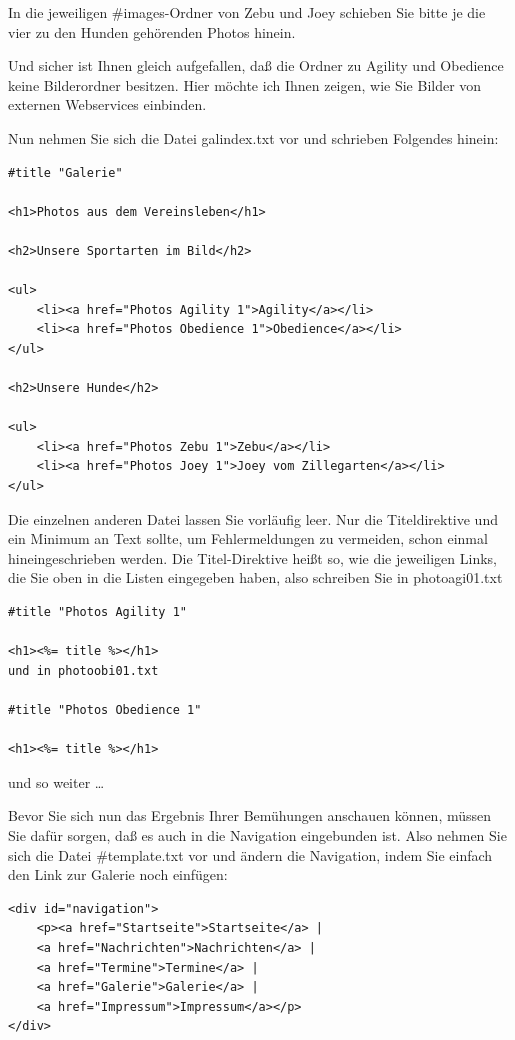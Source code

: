 \documentclass[11pt]{report}
\begin{document}
In die jeweiligen \#images-Ordner von Zebu und Joey schieben Sie bitte
je die vier zu den Hunden gehörenden Photos hinein.


Und sicher ist Ihnen gleich aufgefallen, daß die Ordner zu Agility und
Obedience keine Bilderordner besitzen. Hier möchte ich Ihnen zeigen,
wie Sie Bilder von externen Webservices einbinden.


Nun nehmen Sie sich die Datei galindex.txt vor und schrieben Folgendes
hinein:


\begin{verbatim}
#title "Galerie"

<h1>Photos aus dem Vereinsleben</h1>

<h2>Unsere Sportarten im Bild</h2>

<ul>
    <li><a href="Photos Agility 1">Agility</a></li>
    <li><a href="Photos Obedience 1">Obedience</a></li>
</ul>

<h2>Unsere Hunde</h2>

<ul>
    <li><a href="Photos Zebu 1">Zebu</a></li>
    <li><a href="Photos Joey 1">Joey vom Zillegarten</a></li>
</ul>
\end{verbatim}

Die einzelnen anderen Datei lassen Sie vorläufig leer. Nur die
Titeldirektive und ein Minimum an Text sollte, um Fehlermeldungen zu
vermeiden, schon einmal hineingeschrieben werden. Die Titel-Direktive
heißt so, wie die jeweiligen Links, die Sie oben in die Listen
eingegeben haben, also schreiben Sie in photoagi01.txt


\begin{verbatim}
#title "Photos Agility 1"

<h1><%= title %></h1>
und in photoobi01.txt

#title "Photos Obedience 1"

<h1><%= title %></h1>
\end{verbatim}

und so weiter …

Bevor Sie sich nun das Ergebnis Ihrer Bemühungen anschauen können,
müssen Sie dafür sorgen, daß es auch in die Navigation eingebunden
ist. Also nehmen Sie sich die Datei \#template.txt vor und ändern die
Navigation, indem Sie einfach den Link zur Galerie noch einfügen:


\begin{verbatim}
<div id="navigation">
    <p><a href="Startseite">Startseite</a> | 
    <a href="Nachrichten">Nachrichten</a> | 
    <a href="Termine">Termine</a> | 
    <a href="Galerie">Galerie</a> | 
    <a href="Impressum">Impressum</a></p>
</div>
\end{verbatim}
\end{document}
